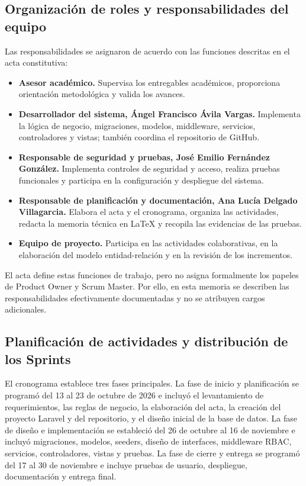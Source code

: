 \subsection{Organización de roles y responsabilidades del equipo}

Las responsabilidades se asignaron de acuerdo con las funciones descritas en el acta constitutiva:

\begin{itemize}
    \item \textbf{Asesor académico.} Supervisa los entregables académicos, proporciona orientación metodológica y valida los avances.
    \item \textbf{Desarrollador del sistema, Ángel Francisco Ávila Vargas.} Implementa la lógica de negocio, migraciones, modelos, middleware, servicios, controladores y vistas; también coordina el repositorio de GitHub.
    \item \textbf{Responsable de seguridad y pruebas, José Emilio Fernández González.} Implementa controles de seguridad y acceso, realiza pruebas funcionales y participa en la configuración y despliegue del sistema.
    \item \textbf{Responsable de planificación y documentación, Ana Lucía Delgado Villagarcia.} Elabora el acta y el cronograma, organiza las actividades, redacta la memoria técnica en \LaTeX{} y recopila las evidencias de las pruebas.
    \item \textbf{Equipo de proyecto.} Participa en las actividades colaborativas, en la elaboración del modelo entidad-relación y en la revisión de los incrementos.
\end{itemize}

El acta define estas funciones de trabajo, pero no asigna formalmente los papeles de Product Owner y Scrum Master. Por ello, en esta memoria se describen las responsabilidades efectivamente documentadas y no se atribuyen cargos adicionales.

\subsection{Planificación de actividades y distribución de los Sprints}

El cronograma establece tres fases principales. La fase de inicio y planificación se programó del 13 al 23 de octubre de 2026 e incluyó el levantamiento de requerimientos, las reglas de negocio, la elaboración del acta, la creación del proyecto Laravel y del repositorio, y el diseño inicial de la base de datos. La fase de diseño e implementación se estableció del 26 de octubre al 16 de noviembre e incluyó migraciones, modelos, seeders, diseño de interfaces, middleware RBAC, servicios, controladores, vistas y pruebas. La fase de cierre y entrega se programó del 17 al 30 de noviembre e incluye pruebas de usuario, despliegue, documentación y entrega final.

